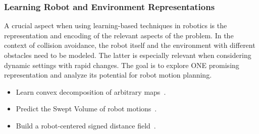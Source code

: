 \documentclass[a4paper]{article}
\begin{document}
\subsubsection{Learning Robot and Environment Representations}
    A crucial aspect when using learning-based techniques in robotics is the representation and encoding of the relevant aspects of the problem.
    In the context of collision avoidance, the robot itself and the environment with different obstacles need to be modeled. 
The latter is especially relevant when considering dynamic settings with rapid changes.  
The goal is to explore ONE promising representation and analyze its potential for robot motion planning.
\begin{itemize}
	\item Learn convex decomposition of arbitrary maps~\cite{Deng2020cvxnet}.
	\item Predict the Swept Volume of robot motions~\cite{Baxter2020SweptVolume}.
	\item Build a robot-centered signed distance field~\cite{Liu2023linkSDF}.
\end{itemize}


%
\end{document}
